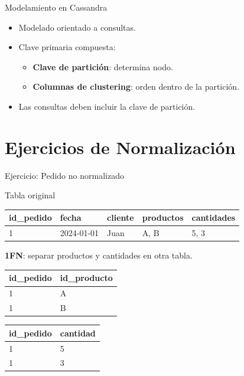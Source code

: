 \documentclass[aspectratio=169, 10pt, xcolor=table]{beamer}
\begin{document}
\begin{frame}{Modelamiento en Cassandra}
    \begin{itemize}
        \item Modelado orientado a consultas.
        \item Clave primaria compuesta:
        \begin{itemize}
            \item \textbf{Clave de partición}: determina nodo.
            \item \textbf{Columnas de clustering}: orden dentro de la partición.
        \end{itemize}
        \item Las consultas deben incluir la clave de partición.
    \end{itemize}
\end{frame}

\section{Ejercicios de Normalización}

\begin{frame}{Ejercicio: Pedido no normalizado}
    \begin{block}{Tabla original}
        \begin{center}
            \begin{tabular}{l|l|l|l|l}
                id\_pedido & fecha & cliente & productos & cantidades \\
                \hline
                1 & 2024-01-01 & Juan & A, B & 5, 3
            \end{tabular}
        \end{center}
    \end{block}
    \textbf{1FN}: separar productos y cantidades en otra tabla.
    \begin{center}
        \begin{tabular}{l|l}
            id\_pedido & id\_producto \\
            \hline
            1 & A \\
            1 & B
        \end{tabular}
        \hspace{0.3cm}
        \begin{tabular}{l|l}
            id\_pedido & cantidad \\
            \hline
            1 & 5 \\
            1 & 3
        \end{tabular}
    \end{center}
\end{frame}
\end{document}
